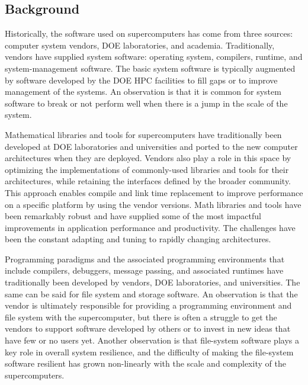 \subsection{Background}
Historically, the software used on supercomputers has come from three sources: computer system vendors, DOE laboratories, and academia. Traditionally, vendors have supplied system software:  operating system, compilers, runtime, and system-management software. The basic system software is typically augmented by software developed by the DOE HPC facilities to fill gaps or to improve management of the systems. An observation is that it is common for system software to break or not perform well when there is a jump in the scale of the system.
 
Mathematical libraries and tools for supercomputers have traditionally been developed at DOE laboratories and universities and ported to the new computer architectures when they are deployed. Vendors also play a role in this space by optimizing the implementations of commonly-used libraries and tools for their architectures, while retaining the interfaces defined by the broader community.  This approach enables compile and link time replacement to improve performance on a specific platform by using the vendor versions.  Math libraries and tools have been remarkably robust and have supplied some of the most impactful improvements in application performance and productivity. The challenges have been the constant adapting and tuning to rapidly changing architectures.
 
Programming paradigms and the associated programming environments that include compilers, debuggers, message passing, and associated runtimes have traditionally been developed by vendors, DOE laboratories, and universities. The same can be said for file system and storage software. An observation is that the vendor is ultimately responsible for providing a programming environment and file system with the supercomputer, but there is often a struggle to get the vendors to support software developed by others or to invest in new ideas that have few or no users yet. Another observation is that file-system software plays a key role in overall system resilience, and the difficulty of making the file-system software resilient has grown non-linearly with the scale and complexity of the supercomputers.
 
